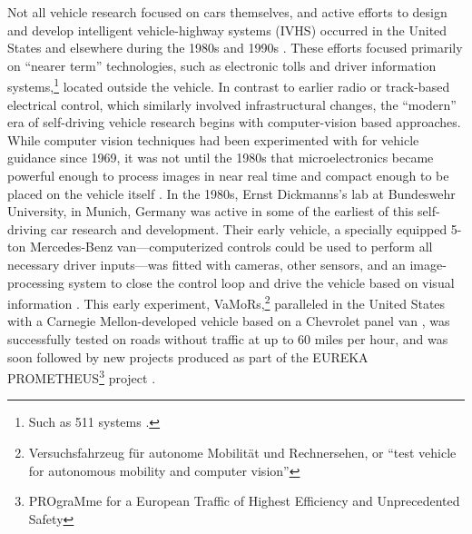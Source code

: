 
Not all vehicle research focused on cars themselves, and active
efforts to design and develop intelligent vehicle-highway systems (IVHS) occurred
in the United States and elsewhere during the 1980s and 1990s \cite[p.
  11-12]{wetmore}. These
efforts focused primarily on ``nearer term'' technologies, such as
electronic tolls and driver information systems,\footnote{Such as 511
  systems \cite{costello511}.} located
outside the vehicle. In contrast to earlier radio or track-based
electrical control, which similarly involved infrastructural changes, the 
``modern'' era of self-driving vehicle research begins with
computer-vision based approaches. While computer vision techniques had
been experimented with for vehicle guidance since 1969, it was not
until the 1980s that microelectronics became powerful enough to
process images in near real time and compact enough to be placed on
the vehicle itself \cite[p. v]{dickmannsDynamic} \cite{vamors-p}. In the 1980s, Ernst
Dickmanns's lab at Bundeswehr
University, in Munich, Germany was active in some of the
earliest of this self-driving car research and development. Their early
vehicle, a specially equipped 5-ton Mercedes-Benz van---computerized
controls could be used to perform all necessary driver inputs---was
fitted with cameras, other sensors, and an image-processing system to
close the control loop and drive the vehicle based on visual
information \cite{vamors-p}. This early experiment,
VaMoRs,\footnote{Versuchsfahrzeug f\"{u}r autonome Mobilit\"{a}t und
  Rechnersehen, or ``test vehicle for autonomous mobility and computer
  vision''} paralleled in the United  
States with a Carnegie Mellon-developed vehicle based on a Chevrolet
panel van \cite{bogostHist}, was successfully tested on roads without
traffic at up to 
60 miles per hour, and was soon followed by new projects produced as
part of the EUREKA PROMETHEUS\footnote{PROgraMme for a European
  Traffic of Highest Efficiency and Unprecedented Safety} project
\cite{eureka}. 

